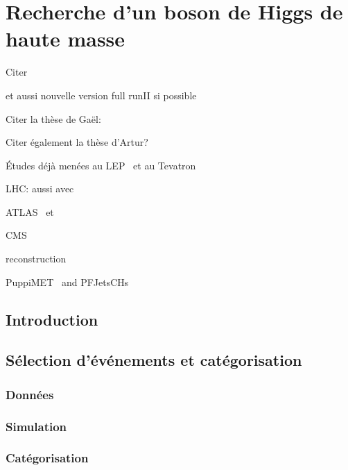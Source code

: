 \chapter{Recherche d'un boson de Higgs de haute masse}\label{chapter-HTT_analysis}

Citer 

et aussi nouvelle version full runII si possible


Citer la thèse de Gaël:\\

Citer également la thèse d'Artur?\\


Études déjà menées au LEP~\cite{Schael:2006cr} et au Tevatron~\cite{Aaltonen:2009vf,Abazov:2011jh}

LHC: aussi avec \quarkb\antiquarkb~\cite{Chatrchyan:2013qga,Khachatryan:2015tra}

ATLAS \mu\mu\ et \tau\tau~\cite{Aad:2012cfr,ATLAS-MSSM-HTT_2018}

CMS \mu\mu~\cite{CMS:2015ooa} \tau\tau~\cite{Chatrchyan:2012vp,CMS-MSSM-HTT_2014,CMS-PAS-HIG-17-020}

reconstruction \tauh~\cite{Khachatryan:2015dfa}

PuppiMET~\cite{PUPPI} and PFJetsCHs

\section{Introduction}\label{chapter-HTT_analysis-section-introduction}

\section{Sélection d'événements et catégorisation}\label{chapter-HTT_analysis-section-evt_selection}
\subsection{Données}\label{chapter-HTT_analysis-section-evt_selection-subsec-data}
\subsection{Simulation}\label{chapter-HTT_analysis-section-evt_selection-subsec-MC}
\subsection{Catégorisation}\label{chapter-HTT_analysis-section-evt_selection-subsec-categorisation}

